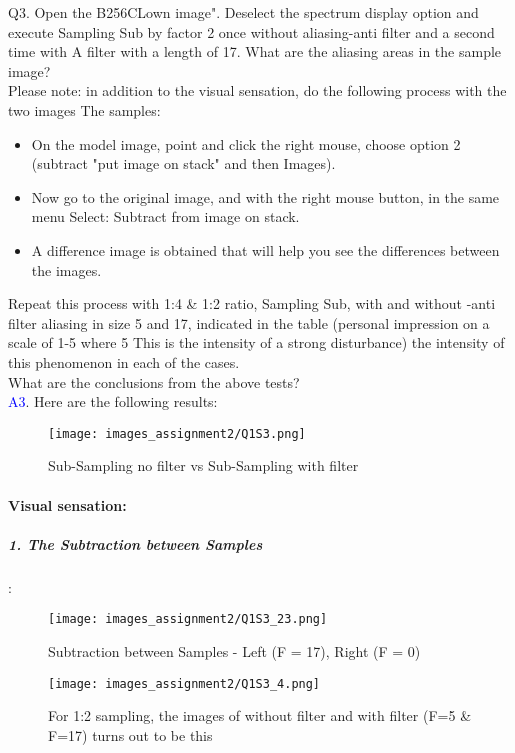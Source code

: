 \documentclass[letterpaper, 12pt]{article}
\begin{document}
Q3. Open the B256CLown image". Deselect the spectrum display option and execute
Sampling Sub by factor 2 once without aliasing-anti filter and a second time with
A filter with a length of 17. What are the aliasing areas in the sample image? \\

Please note: in addition to the visual sensation, do the following process with the two images The samples: \\
\begin{itemize}
    \item On the model image, point and click the right mouse, choose option 2 (subtract "put image on stack" and then Images). \\
    \item Now go to the original image, and with the right mouse button, in the same menu Select: Subtract from image on stack. \\
    \item A difference image is obtained that will help you see the differences between the images. \\
\end{itemize}

Repeat this process with 1:4 \& 1:2 ratio, Sampling Sub, with and without -anti filter
aliasing in size 5 and 17, indicated in the table (personal impression on a scale of 1-5 where 5 This is the intensity of a strong disturbance) the intensity of this phenomenon in each of the cases. \\
What are the conclusions from the above tests? \\
\textcolor{blue}{A3}. Here are the following results:
\begin{figure}[htbp]
    \centering
    \texttt{[image: images\_assignment2/Q1S3.png]}
    \caption{Sub-Sampling no filter vs Sub-Sampling with filter}
\end{figure}
\newpage
\paragraph{Visual sensation:}
\subparagraph{1. The Subtraction between Samples} :

\begin{figure}[htbp]
    \centering
    \texttt{[image: images\_assignment2/Q1S3\_23.png]}
    \caption{Subtraction between Samples - Left (F = 17), Right (F = 0)}
\end{figure}

\begin{figure}[htbp]
    \centering
    \texttt{[image: images\_assignment2/Q1S3\_4.png]}
    \caption{For 1:2 sampling, the images of without filter and with filter (F=5 \& F=17) turns out to be this}
    
\end{figure}
 
\end{document}
